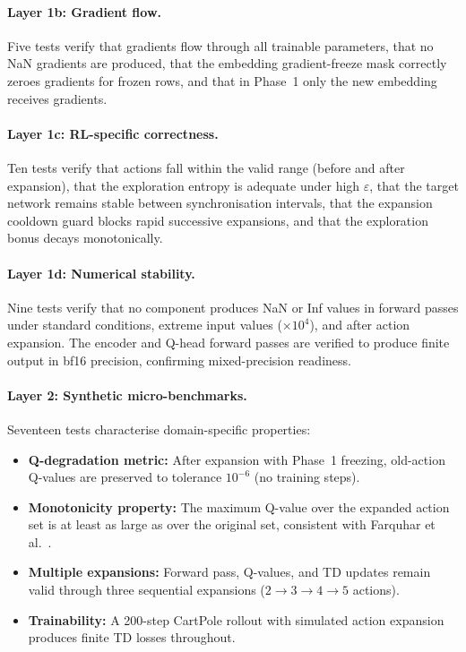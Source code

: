 \documentclass{article}
\begin{document}
\paragraph{Layer 1b: Gradient flow.} Five tests verify that gradients flow through all trainable parameters, that no NaN gradients are produced, that the embedding gradient-freeze mask correctly zeroes gradients for frozen rows, and that in Phase~1 only the new embedding receives gradients.

\paragraph{Layer 1c: RL-specific correctness.} Ten tests verify that actions fall within the valid range (before and after expansion), that the exploration entropy is adequate under high $\varepsilon$, that the target network remains stable between synchronisation intervals, that the expansion cooldown guard blocks rapid successive expansions, and that the exploration bonus decays monotonically.

\paragraph{Layer 1d: Numerical stability.} Nine tests verify that no component produces NaN or Inf values in forward passes under standard conditions, extreme input values ($\times 10^4$), and after action expansion. The encoder and Q-head forward passes are verified to produce finite output in bf16 precision, confirming mixed-precision readiness.

\paragraph{Layer 2: Synthetic micro-benchmarks.} Seventeen tests characterise domain-specific properties:
\begin{itemize}
  \item \textbf{Q-degradation metric:} After expansion with Phase~1 freezing, old-action Q-values are preserved to tolerance $10^{-6}$ (no training steps).
  \item \textbf{Monotonicity property:} The maximum Q-value over the expanded action set is at least as large as over the original set, consistent with Farquhar et al.~\cite{farquhar2020growing}.
  \item \textbf{Multiple expansions:} Forward pass, Q-values, and TD updates remain valid through three sequential expansions ($2\to3\to4\to5$ actions).
  \item \textbf{Trainability:} A 200-step CartPole rollout with simulated action expansion produces finite TD losses throughout.
\end{itemize}
\end{document}
